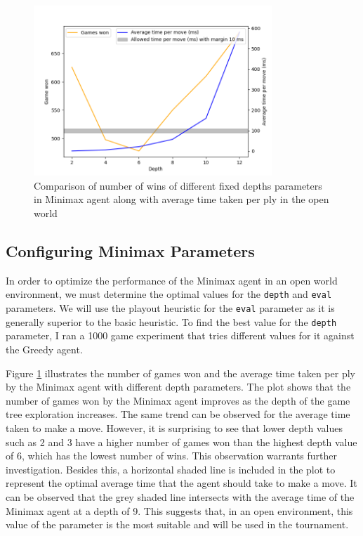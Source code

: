 \begin{figure}[h]
  \centering
  \captionsetup{justification=centering}
  \includegraphics[width=0.8\textwidth]{../img/minimax_config_openworld.png}
  \caption{Comparison of number of wins of different fixed depths parameters in Minimax agent along with average time taken per ply in the open world}
  \label{minimaxOWDepth}
\end{figure}

\subsection{Configuring Minimax Parameters}

In order to optimize the performance of the Minimax agent in an open world environment, we must determine the optimal values for the \texttt{depth} and \texttt{eval} parameters. We will use the playout heuristic for the \texttt{eval} parameter as it is generally superior to the basic heuristic. To find the best value for the \texttt{depth} parameter, I ran a 1000 game experiment that tries different values for it against the Greedy agent. 

Figure \ref{minimaxOWDepth} illustrates the number of games won and the average time taken per ply by the Minimax agent with different depth parameters. The plot shows that the number of games won by the Minimax agent improves as the depth of the game tree exploration increases. The same trend can be observed for the average time taken to make a move. However, it is surprising to see that lower depth values such as 2 and 3 have a higher number of games won than the highest depth value of 6, which has the lowest number of wins. This observation warrants further investigation. Besides this, a horizontal shaded line is included in the plot to represent the optimal average time that the agent should take to make a move. It can be observed that the grey shaded line intersects with the average time of the Minimax agent at a depth of 9. This suggests that, in an open environment, this value of the parameter is the most suitable and will be used in the tournament.

